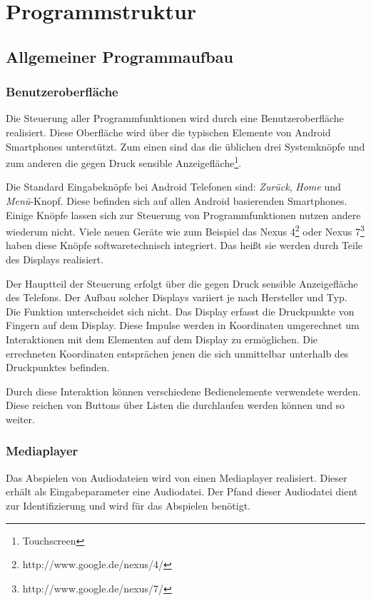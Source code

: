 \section{Programmstruktur}

\subsection{Allgemeiner Programmaufbau}

\subsubsection{Benutzeroberfläche}

Die Steuerung aller Programmfunktionen wird durch eine Benutzeroberfläche realisiert. Diese Oberfläche wird über die typischen Elemente von Android Smartphones unterstützt. Zum einen sind das die üblichen drei Systemknöpfe und zum anderen die gegen Druck sensible Anzeigefläche\footnote{Touchscreen}.

Die Standard Eingabeknöpfe bei Android Telefonen sind: \textit{Zurück}, \textit{Home} und \textit{Menü}-Knopf. Diese befinden sich auf allen Android basierenden Smartphones. Einige Knöpfe lassen sich zur Steuerung von Programmfunktionen nutzen andere wiederum nicht. Viele neuen Geräte wie zum Beispiel das Nexus 4\footnote{http://www.google.de/nexus/4/} oder Nexus 7\footnote{http://www.google.de/nexus/7/} haben diese Knöpfe softwaretechnisch integriert. Das heißt sie werden durch Teile des Displays realisiert.

Der Hauptteil der Steuerung erfolgt über die gegen Druck sensible Anzeigefläche des Telefons. Der Aufbau solcher Displays variiert je nach Hersteller und Typ. Die Funktion unterscheidet sich nicht. Das Display erfasst die Druckpunkte von Fingern auf dem Display. Diese Impulse werden in Koordinaten umgerechnet um Interaktionen mit dem Elementen auf dem Display zu ermöglichen. Die errechneten Koordinaten entsprächen jenen die sich unmittelbar unterhalb des Druckpunktes befinden.

Durch diese Interaktion können verschiedene Bedienelemente verwendete werden. Diese reichen von Buttons über Listen die durchlaufen werden können und so weiter.

\subsubsection{Mediaplayer}

Das Abspielen von Audiodateien wird von einen Mediaplayer realisiert. Dieser erhält als Eingabeparameter eine Audiodatei. Der Pfand dieser Audiodatei dient zur Identifizierung und wird für das Abspielen benötigt.

